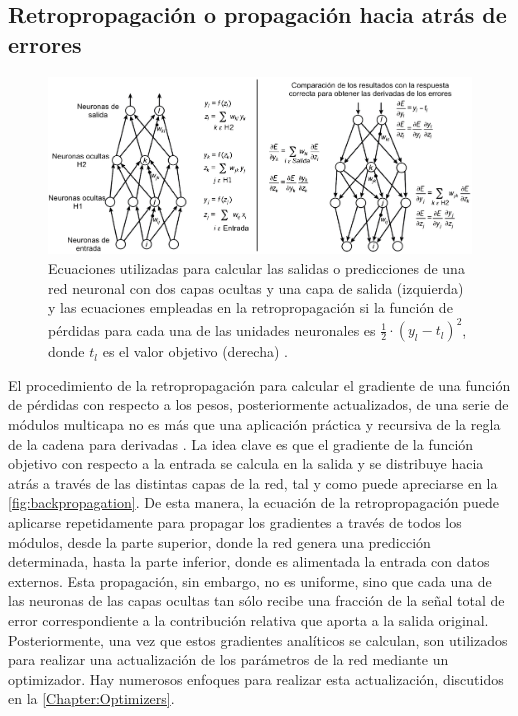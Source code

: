 \subsection{Retropropagación o propagación hacia atrás de errores} \label{Chapter:Backpropagation}

\begin{figure}
    \centering
    \includegraphics[width=\textwidth]{Images/backpropagation.png}
    \caption{Ecuaciones utilizadas para calcular las salidas o predicciones de una red neuronal con dos capas ocultas y una capa de salida (izquierda) y las ecuaciones empleadas en la retropropagación si la función de pérdidas para cada una de las unidades neuronales es $\frac{1}{2}\cdot (y_l - t_l)^2$, donde $t_l$ es el valor objetivo (derecha) \cite{DeepLearning}.}
    \label{fig:backpropagation}
\end{figure}

El procedimiento de la retropropagación para calcular el gradiente de una función de pérdidas con respecto a los pesos, posteriormente actualizados, de una serie de módulos multicapa no es más que una aplicación práctica y recursiva de la regla de la cadena para derivadas \cite{DeepLearning}. La idea clave es que el gradiente de la función objetivo con respecto a la entrada se calcula en la salida y se distribuye hacia atrás a través de las distintas capas de la red, tal y como puede apreciarse en la \autoref{fig:backpropagation}. De esta manera, la ecuación de la retropropagación puede aplicarse repetidamente para propagar los gradientes a través de todos los módulos, desde la parte superior, donde la red genera una predicción determinada, hasta la parte inferior, donde es alimentada la entrada con datos externos. Esta propagación, sin embargo, no es uniforme, sino que cada una de las neuronas de las capas ocultas tan sólo recibe una fracción de la señal total de error correspondiente a la contribución relativa que aporta a la salida original. Posteriormente, una vez que estos gradientes analíticos se calculan, son utilizados para realizar una actualización de los parámetros de la red mediante un optimizador. Hay numerosos enfoques para realizar esta actualización, discutidos en la \autoref{Chapter:Optimizers}.


